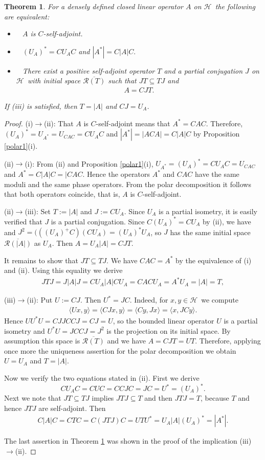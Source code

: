 \documentclass[12pt]{amsart}
\newcommand{\cR}{\mathcal{R}}
\newtheorem{thm}{Theorem}
\theoremstyle{definition}
\newcommand{\cH}{\mathcal{H}\,}
\newcommand{\ov}{\overline}
\begin{document}
\begin{thm}\label{polar2}
For a densely defined closed linear operator $A$ on $\cH$ the following are equivalent:
\begin{itemize}
\item[ (i)]~ $A$ is $C$-self-adjoint.
\item[(ii)] ~ $(U_A)^*=CU_AC$ and $|A^*|=C|A|C.$
\item[ (iii)] ~ There exist a positive self-adjoint operator $T$ and a partial conjugation $J$ on $\cH$ with initial space $\ov{\cR(T)}$ such that $JT\subseteq TJ$  and
\begin{align*}
A=CJT.
\end{align*}
\end{itemize}
If (iii) is satisfied, then $T=|A|$ and $CJ=U_A$.
\end{thm}
\begin{proof}
(i)$\to$(ii): That $A$ is $C$-self-adjoint means that $A^*=CAC$. Therefore, $(U_A)^*= U_{A^*}=U_{CAC}=CU_AC$ and $|A^*|=|ACA|=C|A|C $ by Proposition \ref{polar1}(i).\smallskip

(ii)$\to$(i): From (ii) and  Proposition \ref{polar1}(i), $U_{A^*}=(U_A)^*=CU_AC=U_{CAC}$ and $A^*=C|A|C=|CAC$. Hence the operators $A^*$ and $CAC$ have the same moduli and the same phase operators. From the polar decomposition it follows that both operators coincide, that is, $A$ is $C$-self-adjoint.\smallskip

(ii)$\to$(iii): Set $T:=|A|$ and $J:=CU_A$. Since $U_A$ is a partial isometry, it is easily verified that $J$ is a partial conjugation. Since $C(U_A)^*=CU_A$ by (ii), we have and $J^2=(((U_A)^+C)(CU_A)=(U_A)^*U_A$, so $J$ has the same initial space $\ov{\cR(|A|)}$ as $U_A$. Then $A=U_A |A|=CJ T$.

It remains to show that $JT\subseteq TJ$. We have $CAC=A^*$ by the equivalence of (i) and (ii). Using this equality we derive
 \begin{align*}
JTJ=J|A|J=CU_A|A|CU_A=CACU_A =A^*U_A=|A|=T,
\end{align*}


(iii)$\to$(ii):
Put $U:=CJ$. Then $U^*=JC$. Indeed, for $x,y\in \cH$ we compute
\begin{align*}
\langle Ux,y\rangle=\langle CJx,y\rangle=\langle Cy,Jx\rangle=\langle x,JCy\rangle.
\end{align*}
Hence $UU^*U=CJJCCJ=CJ=U$, so the bounded linear operator $U$ is a partial isometry and $U^*U=JCCJ=J^2$ is the projection on its initial space. By assumption this space is
$\ov{\cR(T)}$ and we have $A=CJT=UT$. Therefore, applying once more the uniqueness assertion for the polar decomposition we obtain $U=U_A$ and $T=|A|$.

Now we verify the two equations stated in (ii). First we derive $$CU_AC= CUC=CCJC=JC=U^*=(U_A)^*.$$
Next we note that $JT\subseteq TJ$ implies $JTJ\subseteq T$ and then $JTJ=T$, because $T$ and hence $JTJ$ are self-adjoint. Then
\begin{align*}
C|A|C= CTC=C(JTJ)C=UTU^*=U_A|A|(U_A)^*=|A^* |.
\end{align*}

The last assertion  in Theorem \ref{polar2} was  shown in the proof of the implication (iii)$\to$(ii).
\end{proof}
\end{document}
